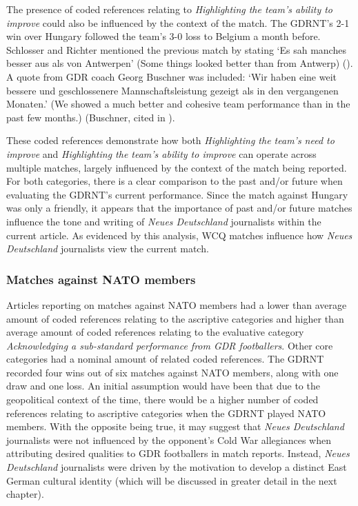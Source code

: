 The presence of coded references relating to \textit{Highlighting the team’s ability to improve} could also be influenced by the context of the match. The GDRNT’s 2-1 win over Hungary followed the team’s 3-0 loss to Belgium a month before. Schlosser and Richter mentioned the previous match by stating ‘Es sah manches besser aus als von Antwerpen’ (Some things looked better than from Antwerp) (\cite{nd19730517}). A quote from GDR coach Georg Buschner was included: ‘Wir haben eine weit bessere und geschlossenere Mannschaftsleistung gezeigt als in den vergangenen Monaten.’ (We showed a much better and cohesive team performance than in the past few months.) (Buschner, cited in \cite{nd19730517}).

These coded references demonstrate how both \textit{Highlighting the team’s need to improve} and \textit{Highlighting the team’s ability to improve} can operate across multiple matches, largely influenced by the context of the match being reported. For both categories, there is a clear comparison to the past and/or future when evaluating the GDRNT’s current performance. Since the match against Hungary was only a friendly, it appears that the importance of past and/or future matches influence the tone and writing of \textit{Neues Deutschland} journalists within the current article. As evidenced by this analysis, WCQ matches influence how \textit{Neues Deutschland} journalists view the current match.

\subsubsection*{Matches against NATO members}

Articles reporting on matches against NATO members had a lower than average amount of coded references relating to the ascriptive categories and higher than average amount of coded references relating to the evaluative category \textit{Acknowledging a sub-standard performance from GDR footballers}. Other core categories had a nominal amount of related coded references. The GDRNT recorded four wins out of six matches against NATO members, along with one draw and one loss. An initial assumption would have been that due to the geopolitical context of the time, there would be a higher number of coded references relating to ascriptive categories when the GDRNT played NATO members. With the opposite being true, it may suggest that \textit{Neues Deutschland} journalists were not influenced by the opponent’s Cold War allegiances when attributing desired qualities to GDR footballers in match reports. Instead, \textit{Neues Deutschland} journalists were driven by the motivation to develop a distinct East German cultural identity (which will be discussed in greater detail in the next chapter).

